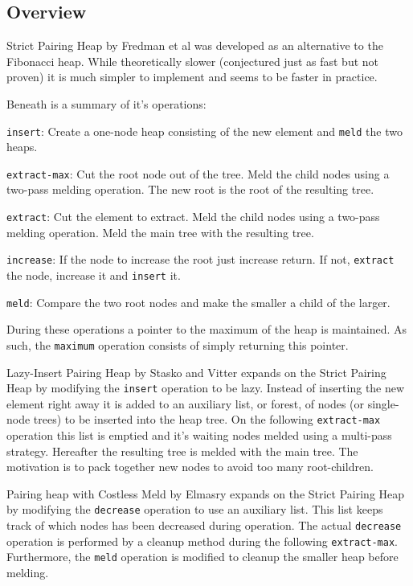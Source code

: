 \documentclass{DIKU-article}[2010/01/13]
\newcommand{\code}[1]{{\small\texttt{#1}}}
\begin{document}
\subsection{Overview}
\begin{description}
\item{Strict Pairing Heap} by Fredman et al\cite{fredman} was
  developed as an alternative to the Fibonacci heap. While
  theoretically slower (conjectured just as fast but not proven) it is
  much simpler to implement and seems to be faster in practice.

  Beneath is a summary of it's operations:
  \begin{description}
  \item{\code{insert}}: Create a one-node heap consisting of the new
    element and \code{meld} the two heaps.
  \item{\code{extract-max}}: Cut the root node out of the tree. Meld
    the child nodes using a two-pass melding operation. The new root
    is the root of the resulting tree.
  \item{\code{extract}}: Cut the element to extract. Meld the child
    nodes using a two-pass melding operation. Meld the main tree with
    the resulting tree.
  \item{\code{increase}}: If the node to increase the root just
    increase return. If not, \code{extract} the node, increase it and
    \code{insert} it.
  \item{\code{meld}}: Compare the two root nodes and make the smaller a
    child of the larger.
  \end{description}
  During these operations a pointer to the maximum of the heap is
  maintained. As such, the \code{maximum} operation consists of simply
  returning this pointer.\\

\item{Lazy-Insert Pairing Heap} by Stasko and Vitter expands on the
  Strict Pairing Heap by modifying the \code{insert} operation to be
  lazy. Instead of inserting the new element right away it is added to
  an auxiliary list, or forest, of nodes (or single-node trees) to be
  inserted into the heap tree. On the following \code{extract-max}
  operation this list is emptied and it's waiting nodes melded using a
  multi-pass strategy. Hereafter the resulting tree is melded with the
  main tree. The motivation is to pack together new nodes to avoid too
  many root-children.

\item{Pairing heap with Costless Meld} by Elmasry\cite{elmasry}
  expands on the Strict Pairing Heap by modifying the \code{decrease}
  operation to use an auxiliary list. This list keeps track of which
  nodes has been decreased during operation. The actual
  \code{decrease} operation is performed by a cleanup method during
  the following \code{extract-max}. Furthermore, the \code{meld}
  operation is modified to cleanup the smaller heap before melding.


\end{description}
\end{document}
